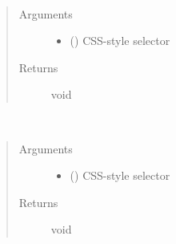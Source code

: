 \documentclass[a4paper,12pt,english]{sphinxmanual}
\begin{document}
\begin{fulllineitems}
\label{\detokenize{viewer/parameters:BIMDataViewer.select}}~\begin{quote}\begin{description}
\item[{Arguments}] \leavevmode\begin{itemize}
\item {} 
 () \textendash{} CSS-style selector

\end{itemize}

\item[{Returns}] \leavevmode
void

\end{description}\end{quote}

\end{fulllineitems}



\begin{fulllineitems}
\label{\detokenize{viewer/parameters:BIMDataViewer.deselect}}~\begin{quote}\begin{description}
\item[{Arguments}] \leavevmode\begin{itemize}
\item {} 
 () \textendash{} CSS-style selector

\end{itemize}

\item[{Returns}] \leavevmode
void

\end{description}\end{quote}

\end{fulllineitems}
\end{document}
